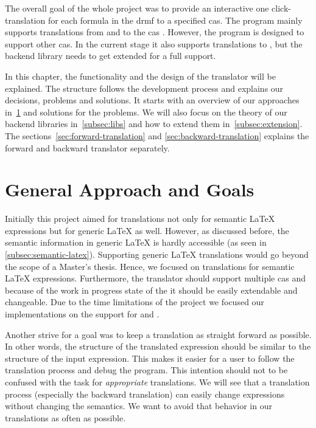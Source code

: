 The overall goal of the whole project was to provide an interactive one click-translation for each formula in the \gls{drmf} to a specified \gls{cas}. The program mainly supports translations from and to the \gls{cas} \Maple. However, the program is designed to support other \gls{cas}. In the current stage it also supports translations to \Mathematica{}, but the backend library needs to get extended for a full support.

In this chapter, the functionality and the design of the translator will be explained. The structure follows the development process and explains our decisions, problems and solutions. It starts with an overview of our approaches in~\ref{sec:gen-appr} and solutions for the problems. We will also focus on the theory of our backend libraries in~\ref{subsec:libs} and how to extend them in~\ref{subsec:extension}. The sections~\ref{sec:forward-translation} and \ref{sec:backward-translation} explains the forward and backward translator separately.

\section{General Approach and Goals}\label{sec:gen-appr}
Initially this project aimed for translations not only for semantic \LaTeX{} expressions but for generic \LaTeX{} as well. However, as discussed before, the semantic information in generic \LaTeX{} is hardly accessible (as seen in \ref{subsec:semantic-latex}). Supporting generic \LaTeX{} translations would go beyond the scope of a Master's thesis. Hence, we focused on translations for semantic \LaTeX{} expressions. Furthermore, the translator should support multiple \gls{cas} and because of the work in progress state of the \Macro{} it should be easily extendable and changeable. Due to the time limitations of the project we focused our implementations on the support for \Maple{} and \Mathematica.

Another strive for a goal was to keep a translation as straight forward as possible. In other words, the structure of the translated expression should be similar to the structure of the input expression. This makes it easier for a user to follow the translation process and debug the program. This intention should not to be confused with the task for \textit{appropriate} translations. We will see that a translation process (especially the backward translation) can easily change expressions without changing the semantics. We want to avoid that behavior in our translations as often as possible.

